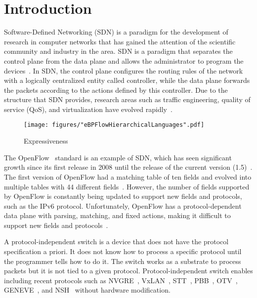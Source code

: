 \section{Introduction}
\label{sec:intro}

Software-Defined Networking (SDN) is a paradigm for the development of research in computer networks that has gained the attention of the scientific community and industry in the area. SDN is a paradigm that separates the control plane from the data plane and allows the administrator to program the devices~\cite{ProgrammableNetworks2015}. In SDN, the control plane configures the routing rules of the network with a logically centralized entity called controller, while the data plane forwards the packets according to the actions defined by this controller. Due to the structure that SDN provides, research areas such as traffic engineering, quality of service (QoS), and virtualization have evolved rapidly~\cite{stubbe2017p4}.

 \begin{figure}[!htp]
 \centering
\texttt{[image: figures/"eBPFlowHierarchicalLanguages".pdf]}
 \caption{Expressiveness}
 \label{fig:Language}
 \end{figure}
 
The OpenFlow~\cite{McKeown:2008:OpenFlow} standard is an example of SDN, which has seen significant growth since its first release in 2008 until the release of the current version (1.5)~\cite{ChristianSurveySDN2015}. The first version of OpenFlow had a matching table of ten fields and evolved into multiple tables with 44 different fields~\cite{ChristianSurveySDN2015}. However, the number of fields supported by OpenFlow is constantly being updated to support new fields and protocols, such as the IPv6 protocol. Unfortunately, OpenFlow has a protocol-dependent data plane with parsing, matching, and fixed actions, making it difficult to support new fields and protocols~\cite{Jouet:2017:BPFabric}.

A protocol-independent switch is a device that does not have the protocol specification a priori. It does not know how to process a specific protocol until the programmer tells how to do it. The switch works as a substrate to process packets but it is not tied to a given protocol. Protocol-independent switch enables including recent protocols such as NVGRE~\cite{rfc7637}, VxLAN~\cite{mahalingam2013}, STT~\cite{davie2014stt}, PBB~\cite{kishjac-bmwg-evpntest-08}, OTV~\cite{hasmit-otv-04}, GENEVE~\cite{ietf-nvo3-geneve-05}, and NSH~\cite{rfc8300} without hardware modification.

